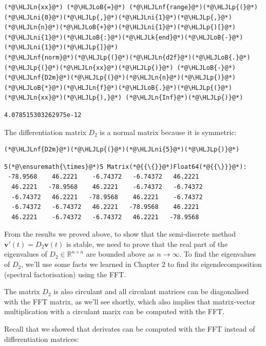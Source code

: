 \documentclass[12pt,a4paper]{article}
\newcommand{\HLJLk}[1]{\textcolor[RGB]{148,91,176}{\textbf{#1}}}
\newcommand{\HLJLn}[1]{#1}
\newcommand{\HLJLnf}[1]{\textcolor[RGB]{66,102,213}{#1}}
\newcommand{\HLJLni}[1]{\textcolor[RGB]{59,151,46}{#1}}
\newcommand{\HLJLoB}[1]{\textcolor[RGB]{102,102,102}{\textbf{#1}}}
\newcommand{\HLJLp}[1]{#1}
\begin{document}
\begin{lstlisting}
(*@\HLJLn{xx}@*) (*@\HLJLoB{=}@*) (*@\HLJLnf{range}@*)(*@\HLJLp{(}@*)(*@\HLJLni{0}@*)(*@\HLJLp{,}@*)(*@\HLJLni{1}@*)(*@\HLJLp{,}@*)(*@\HLJLn{n}@*)(*@\HLJLoB{+}@*)(*@\HLJLni{1}@*)(*@\HLJLp{)[}@*)(*@\HLJLni{1}@*)(*@\HLJLoB{:}@*)(*@\HLJLk{end}@*)(*@\HLJLoB{-}@*)(*@\HLJLni{1}@*)(*@\HLJLp{]}@*)
(*@\HLJLnf{norm}@*)(*@\HLJLp{(}@*)(*@\HLJLn{d2f}@*)(*@\HLJLoB{.}@*)(*@\HLJLp{(}@*)(*@\HLJLn{xx}@*)(*@\HLJLp{)}@*) (*@\HLJLoB{-}@*) (*@\HLJLnf{D2m}@*)(*@\HLJLp{(}@*)(*@\HLJLn{n}@*)(*@\HLJLp{)}@*)(*@\HLJLoB{*}@*)(*@\HLJLn{f}@*)(*@\HLJLoB{.}@*)(*@\HLJLp{(}@*)(*@\HLJLn{xx}@*)(*@\HLJLp{),}@*) (*@\HLJLn{Inf}@*)(*@\HLJLp{)}@*)
\end{lstlisting}

\begin{lstlisting}
4.078515303262975e-12
\end{lstlisting}


The differentiation matrix $D_2$ is a normal matrix because it is symmetric:


\begin{lstlisting}
(*@\HLJLnf{D2m}@*)(*@\HLJLp{(}@*)(*@\HLJLni{5}@*)(*@\HLJLp{)}@*)
\end{lstlisting}

\begin{lstlisting}
5(*@\ensuremath{\times}@*)5 Matrix(*@{{\{}}@*)Float64(*@{{\}}}@*):
 -78.9568    46.2221    -6.74372   -6.74372   46.2221
  46.2221   -78.9568    46.2221    -6.74372   -6.74372
  -6.74372   46.2221   -78.9568    46.2221    -6.74372
  -6.74372   -6.74372   46.2221   -78.9568    46.2221
  46.2221    -6.74372   -6.74372   46.2221   -78.9568
\end{lstlisting}


From the results we proved above, to show that the semi-discrete method $\mathbf{v}'(t) = D_2 \mathbf{v}(t)$ is stable, we need to prove that the real part of the eigenvalues of $D_2 \in \mathbb{R}^{n \times n}$ are bounded above as $n \to \infty$.  To find the eigenvalues of $D_2$, we'll use some facts we learned in Chapter 2 to find its eigendecomposition (spectral factorisation) using the FFT.

The matrix $D_2$ is also circulant and all circulant matrices can be diagonalised with the FFT matrix, as we'll see shortly, which also implies that matrix-vector multiplication with a circulant marix can be computed with the FFT.

Recall that we showed that derivates can be computed with the FFT instead of differentiation matrices:
\end{document}

